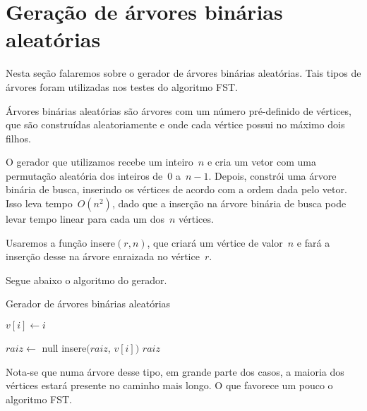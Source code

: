 \section {Geração de árvores binárias aleatórias}

Nesta seção falaremos sobre o gerador de árvores binárias 
aleatórias. Tais tipos de árvores foram utilizadas nos 
testes do algoritmo FST.

Árvores binárias aleatórias são árvores com um número 
pré-definido de vértices, que são construídas aleatoriamente e 
onde cada vértice possui no máximo dois filhos.

O gerador que utilizamos recebe um inteiro~$n$ e cria um vetor
com uma permutação aleatória dos inteiros de~$0$ a~$n-1$.
Depois, constrói uma árvore binária de busca, inserindo 
os vértices de acordo com a ordem dada pelo vetor.
Isso leva tempo~$O(n^2)$, dado que a inserção na árvore 
binária de busca pode levar tempo linear para cada um dos~$n$ 
vértices.

Usaremos a função {\sc insere}$(r, n)$, que criará
um vértice de valor~$n$ e fará a inserção desse na árvore
enraizada no vértice~$r$.

Segue abaixo o algoritmo do gerador.

\bigskip
\bigskip

\begin{algorithm}[H]
\label{alg:ABAgenerator}

	\caption{Gerador de árvores binárias aleatórias}
	\bigskip
	{
		$v[i] \gets i$\;
	}

	\bigskip
	$raiz\gets$ {\sc null}\;
	{
		{\sc insere}$(raiz$, $v[i])$\;
	}
	\Return $raiz$\;

\end{algorithm}	

\bigskip
\bigskip

Nota-se que numa árvore desse tipo, em grande parte dos 
casos, a maioria dos vértices estará presente no caminho mais 
longo. 
O que favorece um pouco o algoritmo FST.